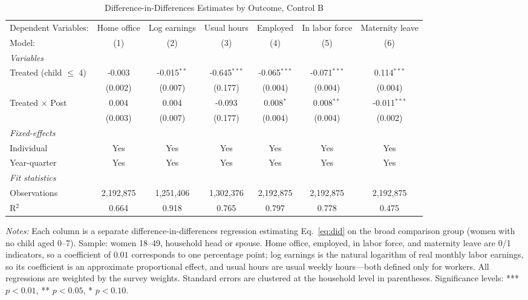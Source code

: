 
\begin{table}[H]
   \caption{\label{tab:did_outcomes_B} Difference-in-Differences Estimates by Outcome, Control B}
   \centering
\footnotesize\setlength{\tabcolsep}{3pt}
   \begin{tabular}{lcccccc}
      \toprule
      Dependent Variables:      & Home office & Log earnings  & Usual hours    & Employed       & In labor force & Maternity leave\\  
      Model:                    & (1)         & (2)           & (3)            & (4)            & (5)            & (6)\\  
      \midrule
      \emph{Variables}\\
      Treated (child $\leq$ 4)  & -0.003      & -0.015$^{**}$ & -0.645$^{***}$ & -0.065$^{***}$ & -0.071$^{***}$ & 0.114$^{***}$\\   
                                & (0.002)     & (0.007)       & (0.177)        & (0.004)        & (0.004)        & (0.004)\\   
\addlinespace[2pt]
      Treated $\times$ Post     & 0.004       & 0.004         & -0.093         & 0.008$^{*}$    & 0.008$^{**}$   & -0.011$^{***}$\\   
                                & (0.003)     & (0.007)       & (0.177)        & (0.004)        & (0.004)        & (0.002)\\   
\addlinespace[2pt]
      \midrule
      \emph{Fixed-effects}\\
      Individual                & Yes         & Yes           & Yes            & Yes            & Yes            & Yes\\  
      Year-quarter              & Yes         & Yes           & Yes            & Yes            & Yes            & Yes\\  
      \midrule
      \emph{Fit statistics}\\
      Observations              & 2,192,875   & 1,251,406     & 1,302,376      & 2,192,875      & 2,192,875      & 2,192,875\\  
      R$^2$                     & 0.664       & 0.918         & 0.765          & 0.797          & 0.778          & 0.475\\  
\bottomrule
   \end{tabular}
   
   \par \raggedright 
   \footnotesize\textit{Notes:} Each column is a separate difference-in-differences regression estimating Eq.~\eqref{eq:did} on the broad comparison group (women with no child aged 0--7). Sample: women 18--49, household head or spouse. Home office, employed, in labor force, and maternity leave are 0/1 indicators, so a coefficient of $0.01$ corresponds to one percentage point; log earnings is the natural logarithm of real monthly labor earnings, so its coefficient is an approximate proportional effect, and usual hours are usual weekly hours---both defined only for workers. All regressions are weighted by the survey weights. Standard errors are clustered at the household level in parentheses. Significance levels: *** $p<0.01$, ** $p<0.05$, * $p<0.10$.
\end{table}


